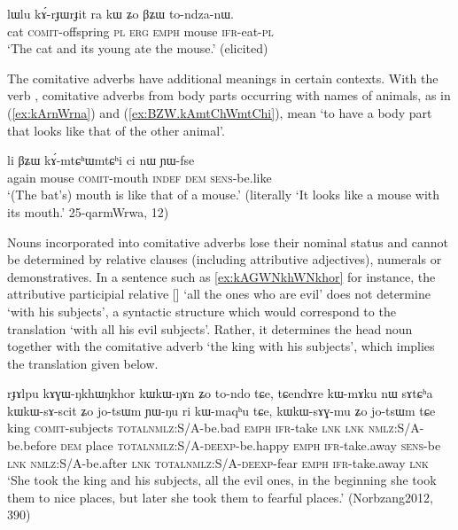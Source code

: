 \begin{exe}
\ex \label{ex:kArJWrJit.kW}
\gll lɯlu	kɤ́-rɟɯ\tld{}rɟit	ra	kɯ	ʑo	βʑɯ	 to-ndza-nɯ. \\
cat \textsc{comit}-offspring \textsc{pl}  \textsc{erg} \textsc{emph} mouse \textsc{ifr}-eat-\textsc{pl} \\
\glt `The cat and its young ate the mouse.' (elicited)
\end{exe}

The comitative adverbs have additional meanings in certain contexts. With the verb ,  comitative adverbs from body parts occurring with names of animals, as in (\ref{ex:kArnWrna}) and (\ref{ex:BZW.kAmtChWmtChi}), mean `to have a body part that looks like that of the other animal'.

\begin{exe}
\ex \label{ex:BZW.kAmtChWmtChi}
\gll
li βʑɯ kɤ́-mtɕʰɯ\redp{}mtɕʰi ci nɯ ɲɯ-fse  \\
again mouse \textsc{comit}-mouth \textsc{indef} \textsc{dem} \textsc{sens}-be.like \\
\glt `(The bat's) mouth is like that of a mouse.' (literally `It looks like a mouse with its mouth.' 25-qarmWrwa, 12)
\end{exe}

Nouns incorporated into comitative adverbs lose their nominal status and cannot be determined by relative clauses (including attributive adjectives), numerals or demonstratives. In a sentence such as \ref{ex:kAGWNkhWNkhor} for instance, the attributive participial relative [] `all the ones who are evil' does not determine  `with his subjects', a syntactic structure which would correspond to the translation `with all his evil subjects'. Rather, it determines the head noun together with the comitative adverb    `the king with his subjects', which implies the translation given below.

\begin{exe}
\ex \label{ex:kAGWNkhWNkhor}
\gll rɟɤlpu 	kɤɣɯ-ŋkhɯ\tld{}ŋkhor 	kɯ\tld{}kɯ-ŋɤn  	ʑo 	to-ndo 	tɕe, 	tɕendɤre 	kɯ-mɤku 	nɯ 	sɤtɕʰa 	kɯ\tld{}kɯ-sɤ-scit 	ʑo 	jo-tsɯm 	ɲɯ-ŋu 	ri 	kɯ-maqʰu 	tɕe, 	kɯ\tld{}kɯ-sɤɣ-mu 	ʑo 	jo-tsɯm 	tɕe \\
king \textsc{comit}-subjects \textsc{total}\tld{}\textsc{nmlz}:S/A-be.bad \textsc{emph} \textsc{ifr}-take \textsc{lnk}  \textsc{lnk} \textsc{nmlz}:S/A-be.before \textsc{dem} place \textsc{total}\tld{}\textsc{nmlz}:S/A-\textsc{deexp}-be.happy \textsc{emph} \textsc{ifr}-take.away \textsc{sens}-be \textsc{lnk} \textsc{nmlz}:S/A-be.after \textsc{lnk} \textsc{total}\tld{}\textsc{nmlz}:S/A-\textsc{deexp}-fear \textsc{emph} \textsc{ifr}-take.away \textsc{lnk} \\
\glt `She took the king and his subjects, all the evil ones, in the beginning she took them to nice places, but later she took them to fearful places.' (Norbzang2012, 390)
\end{exe}

